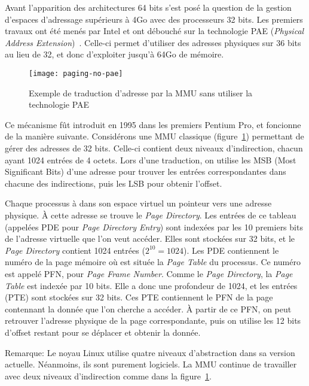       Avant l'apparition des architectures 64 bits s'est posé la question de la
      gestion d'espaces d'adressage supérieurs à 4Go avec des processeurs 32
      bits. Les premiers travaux ont été menés par Intel et ont débouché sur la
      technologie PAE (\textit{Physical Address
        Extension})~\citep{patent6349380}. Celle-ci permet d'utiliser des
      adresses physiques sur 36 bits au lieu de 32, et donc d'exploiter jusqu'à
      64Go de mémoire.

      \begin{figure}[h]
        \centering \texttt{[image: paging-no-pae]}
        \caption{Exemple de traduction d'adresse par la MMU sans utiliser la
          technologie PAE}
        \label{fig:paging-no-pae}
        \end{figure}
      
      Ce mécanisme fût introduit en 1995 dans les premiers Pentium Pro, et
      foncionne de la manière suivante. Considérons une MMU classique
      (figure~\ref{fig:paging-no-pae}) permettant de gérer des adresses de 32
      bits. Celle-ci contient deux niveaux d'indirection, chacun ayant 1024
      entrées de 4 octets. Lors d'une traduction, on utilise les MSB (Most
      Significant Bits) d'une adresse pour trouver les entrées correspondantes
      dans chacune des indirections, puis les LSB pour obtenir l'offset.

      Chaque processus à dans son espace virtuel un pointeur vers une adresse
      physique. À cette adresse se trouve le \textit{Page Directory}. Les
      entrées de ce tableau (appelées PDE pour \textit{Page Directory Entry})
      sont indexées par les 10 premiers bits de l'adresse virtuelle que l'on
      veut accéder. Elles sont stockées sur 32 bits, et le \textit{Page
        Directory} contient 1024 entrées ($2^{10} = 1024$). Les PDE contiennent
      le numéro de la page mémoire où est située la \textit{Page Table} du
      processus. Ce numéro est appelé PFN, pour \textit{Page Frame
        Number}. Comme le \textit{Page Directory}, la \textit{Page Table} est
      indexée par 10 bits. Elle a donc une profondeur de 1024, et les entrées
      (PTE) sont stockées sur 32 bits. Ces PTE contiennent le PFN de la page
      contennant la donnée que l'on cherche a accéder. À partir de ce PFN, on
      peut retrouver l'adresse physique de la page correspondante, puis on
      utilise les 12 bits d'offset restant pour se déplacer et obtenir la
      donnée.

      \begin{paragraph}{Remarque:}
        Le noyau Linux utilise quatre niveaux d'abstraction dans sa version
        actuelle. Néanmoins, ils sont purement logiciels. La MMU continue de
        travailler avec deux niveaux d'indirection comme dans la
        figure~\ref{fig:paging-no-pae}.\newline
      \end{paragraph}
      

